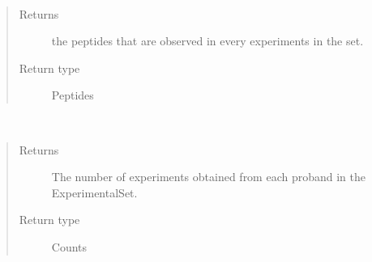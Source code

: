 \documentclass[letterpaper,10pt,english]{sphinxmanual}
\begin{document}
\begin{fulllineitems}
\begin{fulllineitems}
\begin{quote}
\begin{description}
\end{description}\end{quote}

\end{fulllineitems}


\begin{fulllineitems}
\label{\detokenize{IPTK.Classes:IPTK.Classes.ExperimentalSet.ExperimentSet.get_peptides_present_in_all}}~\begin{quote}\begin{description}
\item[{Returns}] \leavevmode
the peptides that are observed in every experiments in the set.

\item[{Return type}] \leavevmode
Peptides

\end{description}\end{quote}

\end{fulllineitems}


\begin{fulllineitems}
\label{\detokenize{IPTK.Classes:IPTK.Classes.ExperimentalSet.ExperimentSet.get_proband_count}}~\begin{quote}\begin{description}
\item[{Returns}] \leavevmode
The number of experiments obtained from each proband in the ExperimentalSet.

\item[{Return type}] \leavevmode
Counts

\end{description}\end{quote}


\end{fulllineitems}
\end{fulllineitems}
\end{document}
